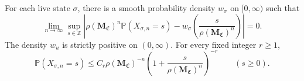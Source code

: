 \begin{lemma}\label{lem:conditional-mass-local-limit}
For each live state $\sigma$, there is a smooth probability density $w_\sigma$ on $[0,\infty)$ such that
\begin{equation}\label{eq:conditional-mass-llt}
 \lim_{n\to\infty}\sup_{s\in\mathbb Z}
 \left|\rho(\mathbf M_{\mathfrak C})^n
 \mathbb P(X_{\sigma,n}=s)
 -w_\sigma\!\left(\frac{s}{\rho(\mathbf M_{\mathfrak C})^n}\right)\right|=0.
\end{equation}
The density $w_u$ is strictly positive on $(0,\infty)$.
For every fixed integer $r\ge1$,
\begin{equation}\label{eq:conditional-mass-point-bound}
 \mathbb P(X_{\sigma,n}=s)\le
 C_r\rho(\mathbf M_{\mathfrak C})^{-n}
 \left(1+\frac{s}{\rho(\mathbf M_{\mathfrak C})^n}\right)^{-r}
 \qquad(s\ge0).
\end{equation}
\end{lemma}
